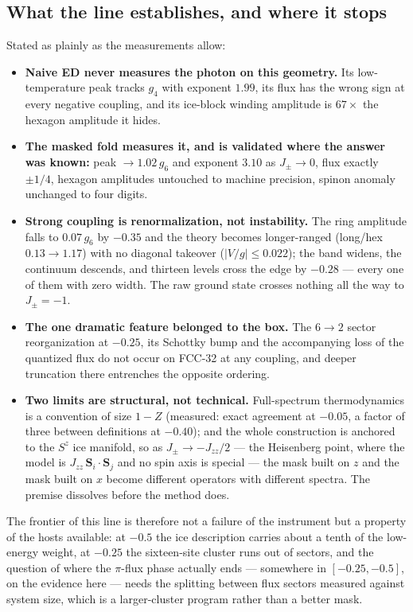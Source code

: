 \documentclass[11pt,a4paper]{article}
\newcommand{\Jpm}{J_{\pm}}
\newcommand{\Jzz}{J_{zz}}
\newcommand{\gfour}{g_4}
\newcommand{\gsix}{g_6}
\begin{document}
\subsection{What the line establishes, and where it stops}

Stated as plainly as the measurements allow:

\begin{itemize}
\item \textbf{Naive ED never measures the photon on this geometry.}  Its
low-temperature peak tracks $\gfour$ with exponent $1.99$, its flux has the
wrong sign at every negative coupling, and its ice-block winding amplitude
is $67\times$ the hexagon amplitude it hides.
\item \textbf{The masked fold measures it, and is validated where the answer
was known:} peak $\to1.02\,\gsix$ and exponent $3.10$ as $\Jpm\to0$, flux
exactly $\pm1/4$, hexagon amplitudes untouched to machine precision, spinon
anomaly unchanged to four digits.
\item \textbf{Strong coupling is renormalization, not instability.}  The
ring amplitude falls to $0.07\,\gsix$ by $-0.35$ and the theory becomes
longer-ranged (long/hex $0.13\to1.17$) with no diagonal takeover
($|V/g|\le0.022$); the band widens, the continuum descends, and thirteen
levels cross the edge by $-0.28$ --- every one of them with zero width.  The
raw ground state crosses nothing all the way to $\Jpm=-1$.
\item \textbf{The one dramatic feature belonged to the box.}  The $6\to2$
sector reorganization at $-0.25$, its Schottky bump and the accompanying
loss of the quantized flux do not occur on FCC-32 at any coupling, and
deeper truncation there entrenches the opposite ordering.
\item \textbf{Two limits are structural, not technical.}  Full-spectrum
thermodynamics is a convention of size $1-Z$ (measured: exact agreement at
$-0.05$, a factor of three between definitions at $-0.40$); and the whole
construction is anchored to the $S^z$ ice manifold, so as $\Jpm\to-\Jzz/2$
--- the Heisenberg point, where the model is $\Jzz\,\mathbf{S}_i\cdot
\mathbf{S}_j$ and no spin axis is special --- the mask built on $z$ and the
mask built on $x$ become different operators with different spectra.  The
premise dissolves before the method does.
\end{itemize}

The frontier of this line is therefore not a failure of the instrument but a
property of the hosts available: at $-0.5$ the ice description carries about
a tenth of the low-energy weight, at $-0.25$ the sixteen-site cluster runs
out of sectors, and the question of where the $\pi$-flux phase actually ends
--- somewhere in $[-0.25,-0.5]$, on the evidence here --- needs the
splitting between flux sectors measured against system size, which is a
larger-cluster program rather than a better mask.
\end{document}
